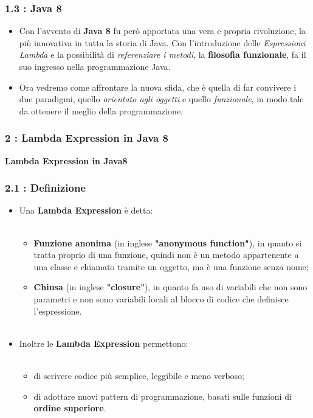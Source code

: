 \documentclass{beamer}
\begin{document}

\begin{frame}
	\frametitle{\textbf{1.3 : Java 8}}
	\begin{itemize}
		\item
			Con l'avvento di \textbf{Java 8} fu però apportata una vera e propria rivoluzione, la più innovativa in tutta la storia di Java. Con l'introduzione delle \textit{Espressioni Lambda} e la possibilità di \textit{referenziare i metodi}, la \textbf{filosofia funzionale}, fa il suo ingresso nella programmazione Java.
		\item
			Ora vedremo come affrontare la nuova sfida, che è quella di far convivere i due paradigmi, quello \textit{orientato agli oggetti} e quello \textit{funzionale}, in modo tale da ottenere il meglio della programmazione.				
	\end{itemize}
\end{frame}


\begin{frame}
	\frametitle{\textbf{2 : Lambda Expression in Java 8}}
	\begin{center}
		\textbf{\Huge Lambda Expression in Java8}
	\end{center}
\end{frame}


\begin{frame}
	\frametitle{\textbf{2.1 : Definizione}}
	\begin{itemize}
			\item
				Una \textbf{Lambda Expression} è detta:\\\
				\begin{itemize}
					\item
						\textbf{Funzione anonima} (in inglese \textbf{"anonymous function"}), in quanto si tratta proprio di una funzione, quindi non è un metodo appartenente a una classe e chiamato tramite un oggetto, ma è una funzione senza nome;
					\item \textbf{Chiusa} (in inglese \textbf{"closure"}), in quanto fa uso di variabili che non sono parametri e non sono variabili locali al blocco di codice che definisce l'espressione.\\\
				\end{itemize}
			\item
				Inoltre le \textbf{Lambda Expression} permettono:\\\
				\begin{itemize}
					\item
						di scrivere codice più semplice, leggibile e meno verboso;
					\item
						di adottare nuovi pattern di programmazione, basati sulle funzioni di \textbf{ordine superiore}.
				\end{itemize}				
	\end{itemize}
\end{frame}
\end{document}
